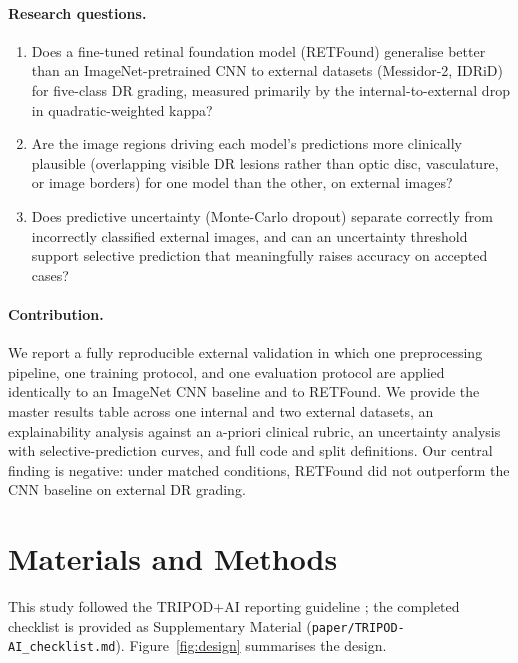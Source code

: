 \documentclass[11pt,a4paper]{article}
\begin{document}
\paragraph{Research questions.}
\begin{enumerate}
  \item[\textbf{RQ1 (Performance).}] Does a fine-tuned retinal foundation model
    (RETFound) generalise better than an ImageNet-pretrained CNN to external
    datasets (Messidor-2, IDRiD) for five-class DR grading, measured primarily
    by the internal-to-external drop in quadratic-weighted kappa?
  \item[\textbf{RQ2 (Explainability).}] Are the image regions driving each
    model's predictions more clinically plausible (overlapping visible DR
    lesions rather than optic disc, vasculature, or image borders) for one
    model than the other, on external images?
  \item[\textbf{RQ3 (Uncertainty).}] Does predictive uncertainty (Monte-Carlo
    dropout) separate correctly from incorrectly classified external images,
    and can an uncertainty threshold support selective prediction that
    meaningfully raises accuracy on accepted cases?
\end{enumerate}

\paragraph{Contribution.} We report a fully reproducible external validation in
which one preprocessing pipeline, one training protocol, and one evaluation
protocol are applied identically to an ImageNet CNN baseline and to RETFound. We
provide the master results table across one internal and two external datasets,
an explainability analysis against an a-priori clinical rubric, an uncertainty
analysis with selective-prediction curves, and full code and split definitions.
Our central finding is negative: under matched conditions, RETFound did not
outperform the CNN baseline on external DR grading.

\section{Materials and Methods}

This study followed the TRIPOD+AI reporting guideline \citep{tripodai2024}; the
completed checklist is provided as Supplementary Material
(\texttt{paper/TRIPOD-AI\_checklist.md}). Figure~\ref{fig:design} summarises the
design.
\end{document}
